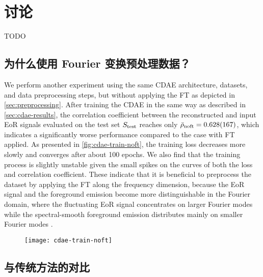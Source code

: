 \section{讨论}

TODO

\subsection{为什么使用 Fourier 变换预处理数据？}
\label{sec:why-ft}

We perform another experiment using the same CDAE architecture,
datasets, and data preprocessing steps, but without
applying the FT as depicted in \autoref{sec:preprocessing}.
After training the CDAE in the same way as described in
\autoref{sec:cdae-results}, the correlation coefficient between the
reconstructed and input EoR signals evaluated on the test set
$S_{\mathrm{test}}$ reaches only $\bar{\rho}_{\mathrm{noft}} = \num{0.628 +- 0.167}$,
which indicates a significantly worse performance compared to the case with
FT applied.
As presented in \autoref{fig:cdae-train-noft}, the training loss decreases more
slowly and converges after about 100 epochs.
We also find that the training process is slightly unstable given the small
spikes on the curves of both the loss and correlation coefficient.
These indicate that it is beneficial to preprocess the
dataset by applying the FT along the frequency dimension, because the
EoR signal and the foreground emission become more distinguishable
in the Fourier domain, where the fluctuating EoR signal concentrates on
larger Fourier modes while the spectral-smooth foreground emission
distributes mainly on smaller Fourier modes \cite{parsons2012}.

\begin{figure}[htp]
  \centering
  \texttt{[image: cdae-train-noft]}
  \label{fig:cdae-train-noft}
\end{figure}


\subsection{与传统方法的对比}

